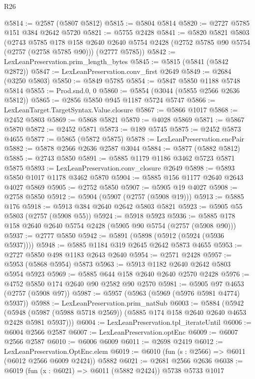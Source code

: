 \begin{lexlean}{R26}
\begin{coremodule}
@5814 := @2587 (@5807 @5812)
@5815 := @5804 @5814
@5820 := @2727 @5785 @151 @384 @2642 @5720
@5821 := @5755 @2428
@5841 := @5820
    @5821
    @5803
    (@2743
      @5785
      @178
      @158
      @2640
      @2640
      @5754
      @2428
      (@2752 @5785 @90 @5754 (@2757 (@2758 @5785 @90)))
      (@2777 @5785))
@5842 := LexLeanPreservation.prim_length_bytes
@5845 := @5815 (@5841 (@5842 @2872))
@5847 := LexLeanPreservation.conv_first @2649
@5849 := @2684 (@3250 @5803)
@5850 := @5849 @5785
@5854 := @5847 @5850 @1188 @5748 @5814
@5855 := Prod.snd.{0, 0}
@5860 := @5854 (@3044 (@5855 @2566 @2636 @5812))
@5865 := @2856 @5850 @945 @1187 @5724 @5747
@5866 := LexLeanTarget.TargetSyntax.Value.closure
@5867 := @5866 @1017
@5868 := @2452 @5803
@5869 := @5868 @5821
@5870 := @4028 @5869
@5871 := @5867 @5870
@5872 := @2452 @5871
@5873 := @189 @5745
@5875 := @2452 @5873 @4655
@5877 := @5865 (@5872 @5875)
@5878 := LexLeanPreservation.encPair
@5882 := @5878 @2566 @2636 @2587 @3044
@5884 := @5877 (@5882 @5812)
@5885 := @2743 @5850
@5891 := @5885 @1179 @1186 @3462 @5723 @5871 @5875
@5893 := LexLeanPreservation.conv_closure @2649
@5898 := @5893 @5850 @1017 @1178 @3462 @5870
@5904 := @5885 @156 @1177 @2640 @2643 @4027 @5869
@5905 := @2752 @5850
@5907 := @5905 @19 @4027
@5908 := @2758 @5850
@5912 := @5904 (@5907 (@2757 (@5908 @19)))
@5913 := @5885 @176
@5918 := @5913 @384 @2640 @2642 @5803 @5821
@5923 := @5905 @55 @5803 (@2757 (@5908 @55))
@5924 := @5918 @5923
@5936 := @5885 @178 @158 @2640 @2640 @5754 @2428 (@5905 @90 @5754 (@2757 (@5908 @90)))
@5937 := @2777 @5850
@5942 := @5891 (@5898 (@5912 (@5924 (@5936 @5937))))
@5948 := @5885 @1184 @319 @2645 @2642 @5873 @4655
@5953 := @2727 @5850 @498 @1183 @2643 @2640
@5954 := @2571 @2428
@5957 := @5953 (@5868 @5954) @5873
@5963 := @5913 @1182 @2640 @2642 @5803 @5954 @5923
@5969 := @5885 @644 @158 @2640 @2640 @2570 @2428
@5976 := @4752 @5850 @174 @2640 @90 @2582 @90 @2570
@5981 := @5905 @97 @4653 (@2757 (@5908 @97))
@5987 := @5957 (@5963 (@5969 (@5976 @5981 @4774) @5937))
@5988 := LexLeanPreservation.prim_natSub
@6003 := @5884
    (@5942
      (@5948 (@5987 (@5988 @5718 @2569)) (@5885 @174 @158 @2640 @2640 @4653 @2428 @5981 @5937)))
@6004 := LexLeanPreservation.tpl_iterateUntil
@6006 := @6004 @2566 @2587
@6007 := LexLeanPreservation.optEnc
@6009 := @6007 @2566 @2587
@6010 := @6006 @6009
@6011 := @2698 @2419
@6012 := LexLeanPreservation.OptEnc.elem
@6019 := @6010 (fun (s : @2566) => @6011 (@6012 @2566 @6009 @2424)) @5882
@6021 := @2681 @2566 @2636
@6038 := @6019
    (fun (x : @6021) => @6011 (@5882 @2424))
    @5738
    @5733
    @1017

\end{coremodule}
\end{lexlean}
